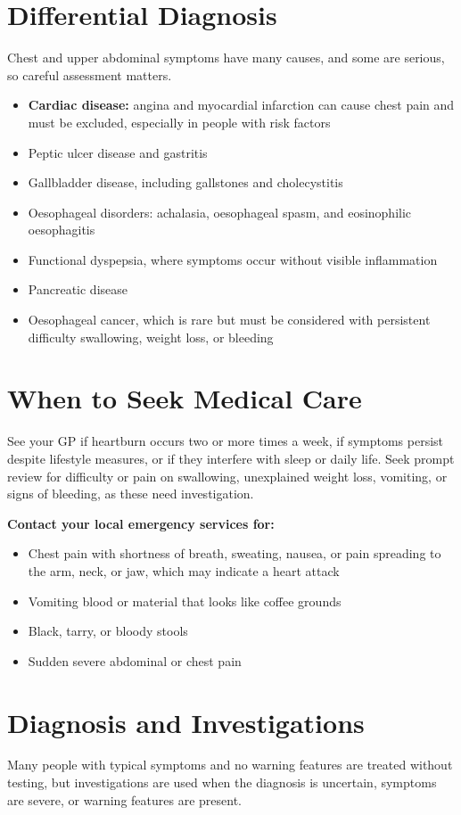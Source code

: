\section*{Differential Diagnosis}
Chest and upper abdominal symptoms have many causes, and some are serious, so careful assessment matters.

\begin{itemize}
    \item \textbf{Cardiac disease:} angina and myocardial infarction can cause chest pain and must be excluded, especially in people with risk factors
    \item Peptic ulcer disease and gastritis
    \item Gallbladder disease, including gallstones and cholecystitis
    \item Oesophageal disorders: achalasia, oesophageal spasm, and eosinophilic oesophagitis
    \item Functional dyspepsia, where symptoms occur without visible inflammation
    \item Pancreatic disease
    \item Oesophageal cancer, which is rare but must be considered with persistent difficulty swallowing, weight loss, or bleeding
\end{itemize}

\section*{When to Seek Medical Care}
See your GP if heartburn occurs two or more times a week, if symptoms persist despite lifestyle measures, or if they interfere with sleep or daily life. Seek prompt review for difficulty or pain on swallowing, unexplained weight loss, vomiting, or signs of bleeding, as these need investigation.

\textbf{Contact your local emergency services for:}
\begin{itemize}
    \item Chest pain with shortness of breath, sweating, nausea, or pain spreading to the arm, neck, or jaw, which may indicate a heart attack
    \item Vomiting blood or material that looks like coffee grounds
    \item Black, tarry, or bloody stools
    \item Sudden severe abdominal or chest pain
\end{itemize}

\section*{Diagnosis and Investigations}
Many people with typical symptoms and no warning features are treated without testing, but investigations are used when the diagnosis is uncertain, symptoms are severe, or warning features are present.

